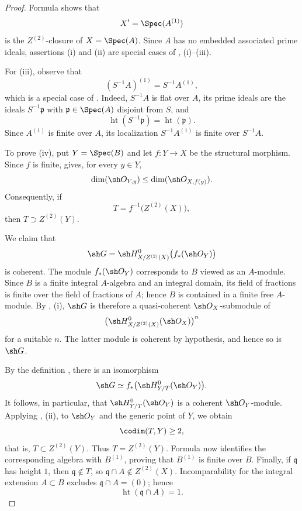 \begin{proof}
Formula  shows that
\[
  X'=\Spec(A^{(1)})
\]
is the $Z^{(2)}$-closure of $X=\Spec(A)$.  Since $A$ has no
embedded associated prime ideals, assertions {\rm(i)} and
{\rm(ii)} are special cases of ,
{\rm(i)--(iii)}.

For {\rm(iii)}, observe that
\[
  (S^{-1}A)^{(1)}=S^{-1}A^{(1)},
\]
which is a special case of .  Indeed, $S^{-1}A$
is flat over $A$, its prime ideals are the ideals
$S^{-1}\mathfrak p$ with
$\mathfrak p\in\Spec(A)$ disjoint from $S$, and
\[
  \operatorname{ht}(S^{-1}\mathfrak p)
  =\operatorname{ht}(\mathfrak p).
\]
Since $A^{(1)}$ is finite over $A$, its localization
$S^{-1}A^{(1)}$ is finite over $S^{-1}A$.

To prove {\rm(iv)}, put $Y=\Spec(B)$ and let $f:Y\to X$ be the
structural morphism.  Since $f$ is finite, 
gives, for every $y\in Y$,
\[
  \dim(\sh O_{Y,y})\leq\dim(\sh O_{X,f(y)}).
\]
Consequently, if
\[
  T=f^{-1}\bigl(Z^{(2)}(X)\bigr),
\]
then $T\supset Z^{(2)}(Y)$.

We claim that
\[
  \sh G=
  \sh H^0_{X/Z^{(2)}(X)}\bigl(f_*(\sh O_Y)\bigr)
\]
is coherent.  The module $f_*(\sh O_Y)$ corresponds to $B$
viewed as an $A$-module.  Since $B$ is a finite integral
$A$-algebra and an integral domain, its field of fractions is
finite over the field of fractions of $A$; hence $B$ is
contained in a finite free $A$-module.  By
, {\rm(i)}, $\sh G$ is therefore a
quasi-coherent $\sh O_X$-submodule of
\[
  \bigl(\sh H^0_{X/Z^{(2)}(X)}(\sh O_X)\bigr)^n
\]
for a suitable $n$.  The latter module is coherent by
hypothesis, and hence so is $\sh G$.

By the definition , there is an isomorphism
\[
  \sh G\simeq
  f_*\bigl(\sh H^0_{Y/T}(\sh O_Y)\bigr).
\]
It follows, in particular, that
$\sh H^0_{Y/T}(\sh O_Y)$ is a coherent $\sh O_Y$-module.
Applying , {\rm(ii)}, to $\sh O_Y$ and the
generic point of $Y$, we obtain
\[
  \codim(T,Y)\geq2,
\]
that is, $T\subset Z^{(2)}(Y)$.  Thus
$T=Z^{(2)}(Y)$.  Formula  now identifies the
corresponding algebra with $B^{(1)}$, proving that $B^{(1)}$ is
finite over $B$.  Finally, if $\mathfrak q$ has height $1$, then
$\mathfrak q\notin T$, so
$\mathfrak q\cap A\notin Z^{(2)}(X)$.  Incomparability for the
integral extension $A\subset B$ excludes
$\mathfrak q\cap A=(0)$; hence
\[
  \operatorname{ht}(\mathfrak q\cap A)=1.
\]
\end{proof}
